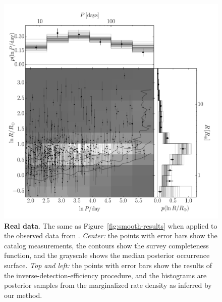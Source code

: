 \documentclass[12pt,preprint]{aastex}
\newcommand{\figref}[1]{\ref{fig:#1}}
\newcommand{\Fig}[1]{Figure~\figref{#1}}
\newcommand{\fig}[1]{\Fig{#1}}
\newcommand{\figlabel}[1]{\label{fig:#1}}
\begin{document}
\begin{figure}[p]
\begin{center}
\includegraphics[width=\textwidth]{figures/results/results.pdf}
\end{center}
\caption{%
{\bf Real data}.
The same as \fig{smooth-results} when applied to the observed data from
\citet{petigura}.
\emph{Center:} the points with error bars show the catalog measurements, the
contours show the survey completeness function, and the grayscale shows the
median posterior occurrence surface.
\emph{Top and left:} the points with error bars show the results of the
inverse-detection-efficiency procedure, and the histograms are posterior
samples from the marginalized rate density as inferred by our method.
\figlabel{real-results}}
\end{figure}
\end{document}

